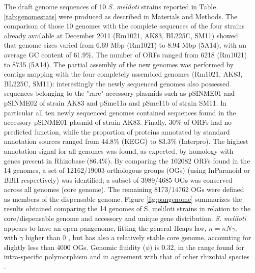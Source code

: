 The draft genome sequences of 10 \textit{S. meliloti} strains reported in Table \ref{tab:genomestats} were produced as described in Materials and Methods. The comparison of those 10 genomes with the complete sequences of the four strains already available at December 2011 (Rm1021, AK83, BL225C, SM11) showed that genome sizes varied from 6.69 Mbp (Rm1021) to 8.94 Mbp (5A14), with an average GC content of 61.9\%. The number of ORFs ranged from 6218 (Rm1021) to 8735 (5A14). The partial assembly of the new genomes was performed by contigs mapping with the four completely assembled genomes (Rm1021, AK83, BL225C, SM11): interestingly the newly sequenced genomes also possessed sequences belonging to the "rare" accessory plasmids such as pSINME01 and pSINME02 of strain AK83 and pSme11a and pSme11b of strain SM11. In particular all ten newly sequenced genomes contained sequences found in the accessory pSINME01 plasmid of strain AK83. Finally, 30\% of ORFs had no predicted function, while the proportion of proteins annotated by standard annotation sources ranged from 44.8\% (KEGG) to 83.3\% (Interpro). The highest annotation signal for all genomes was found, as expected, by homology with genes present in Rhizobase (86.4\%).
By comparing the 102082 ORFs found in the 14 genomes, a set of 12162/19003 orthologous groups (OGs) (using InParanoid or BBH respectively) was identified; a subset of 3989/4685 OGs was conserved across all genomes (core genome). The remaining 8173/14762 OGs were defined as members of the dispensable genome. Figure \ref{fig:pangenome} summarizes the results obtained comparing the 14 genomes of S. meliloti strains in relation to the core/dispensable genome and accessory and unique gene distribution. \textit{S. meliloti} appears to have an open pangenome, fitting the general Heaps law, $n = \kappa N\gamma$, with $\gamma$ higher than 0 \cite{tettelin2008comparative}, but has also a relatively stable core genome, accounting for slightly less than 4000 OGs. Genomic fluidity ($\phi$) is 0.32, in the range found for intra-specific polymorphism \cite{kislyuk2011genomic} and in agreement with that of other rhizobial species \cite{tian2012comparative}.

